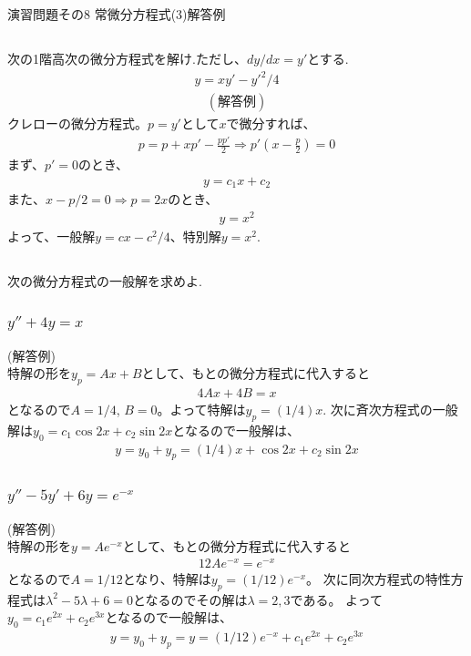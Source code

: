 \documentclass[a4paper,11pt,fleqn]{jarticle}
\begin{document}
\begin{center}
\begin{Large}
演習問題その8  常微分方程式(3)解答例
\end{Large}
\end{center}

\subsection{}
次の1階高次の微分方程式を解け.ただし、$dy/dx=y'$とする.
\begin{eqnarray*}
y=xy'-{y'}^2/4
\end{eqnarray*}
\begin{eqnarray*}
(解答例)
\end{eqnarray*}
クレローの微分方程式。$p=y'$として$x$で微分すれば、
\begin{eqnarray*}
p=p+xp'-\frac{pp'}{2}\Rightarrow p'\left(x-\frac{p}{2}\right)=0
\end{eqnarray*}
まず、$p'=0$のとき、
\begin{eqnarray*}
y=c_1x+c_2
\end{eqnarray*}
また、$x-p/2=0\Rightarrow p=2x$のとき、
\begin{eqnarray*}
y=x^2
\end{eqnarray*}
よって、一般解$y=cx-c^2/4$、特別解$y=x^2$.

\newpage
\subsection{}
次の微分方程式の一般解を求めよ.
\subsubsection{$y''+4y=x$}
(解答例)\\
特解の形を$y_p=Ax+B$として、もとの微分方程式に代入すると
\begin{eqnarray*}
4Ax+4B=x
\end{eqnarray*}
となるので$A=1/4$, $B=0$。よって特解は$y_p=(1/4)x$. 
次に斉次方程式の一般解は$y_0=c_1\cos{2x}+c_2\sin{2x}$となるので一般解は、
\begin{eqnarray*}
y=y_0+y_p=(1/4)x+\cos{2x}+c_2\sin{2x}
\end{eqnarray*}

\subsubsection{$y''-5y'+6y=e^{-x}$}
(解答例)\\
特解の形を$y=Ae^{-x}$として、もとの微分方程式に代入すると
\begin{eqnarray*}
12Ae^{-x}=e^{-x}
\end{eqnarray*}
となるので$A=1/12$となり、特解は$y_p=(1/12)e^{-x}$。
次に同次方程式の特性方程式は$\lambda^2-5\lambda+6=0$となるのでその解は$\lambda=2, 3$である。
よって$y_0=c_1e^{2x}+c_2e^{3x}$となるので一般解は、
\begin{eqnarray*}
y=y_0+y_p=y=(1/12)e^{-x}+c_1e^{2x}+c_2e^{3x}
\end{eqnarray*}
\end{document}
